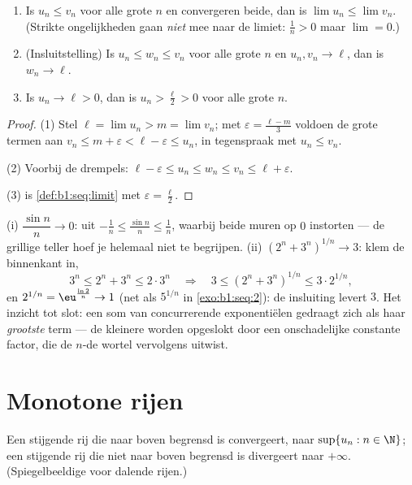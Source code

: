 \begin{theorem}\label{thm:b1:seq:order}
\begin{enumerate}
  \item Is $u_n \leq v_n$ voor alle grote $n$ en convergeren beide, dan
        is $\lim u_n \leq \lim v_n$. (Strikte ongelijkheden gaan
        \emph{niet} mee naar de limiet: $\frac 1n > 0$ maar $\lim = 0$.)
  \item (Insluitstelling) Is $u_n \leq w_n \leq
        v_n$ voor alle grote $n$ en $u_n, v_n \to \ell$, dan is $w_n \to
        \ell$.
  \item Is $u_n \to \ell > 0$, dan is $u_n > \frac\ell2 > 0$ voor alle
        grote $n$.
\end{enumerate}
\end{theorem}

\begin{proof}
(1) Stel $\ell = \lim u_n > m = \lim v_n$; met $\varepsilon = \frac{\ell
- m}{3}$ voldoen de grote termen aan $v_n \leq m + \varepsilon < \ell -
\varepsilon \leq u_n$, in tegenspraak met $u_n \leq v_n$.

(2) Voorbij de drempels: $\ell - \varepsilon \leq u_n \leq w_n \leq v_n
\leq \ell + \varepsilon$.

(3) is \cref{def:b1:seq:limit} met $\varepsilon = \frac\ell2$.
\end{proof}

\begin{example}\label{ex:b1:seq:squeezes}
(i) $\dfrac{\sin n}{n} \to 0$: uit $-\frac1n \leq \frac{\sin n}{n} \leq
\frac1n$, waarbij beide muren op $0$ instorten --- de grillige teller
hoef je helemaal niet te begrijpen. (ii) $(2^n + 3^n)^{1/n} \to 3$: klem
de binnenkant in,
\[
3^n \leq 2^n + 3^n \leq 2\cdot3^n
\quad\Longrightarrow\quad
3 \leq (2^n + 3^n)^{1/n} \leq 3\cdot 2^{1/n} ,
\]
en $2^{1/n} = \eu^{\frac{\ln 2}{n}} \to 1$ (net als $5^{1/n}$ in
\cref{exo:b1:seq:2}): de insluiting levert $3$. Het inzicht tot slot: een
som van concurrerende exponentiëlen gedraagt zich als haar \emph{grootste}
term --- de kleinere worden opgeslokt door een onschadelijke constante
factor, die de $n$-de wortel vervolgens uitwist.
\end{example}

\section{Monotone rijen}

\begin{theorem}\label{thm:b1:seq:monotone}
Een stijgende rij die naar boven begrensd is convergeert, naar $\sup\{u_n
: n \in \N\}$; een stijgende rij die niet naar boven begrensd is
divergeert naar $+\infty$. (Spiegelbeeldige  voor dalende
rijen.)
\end{theorem}

